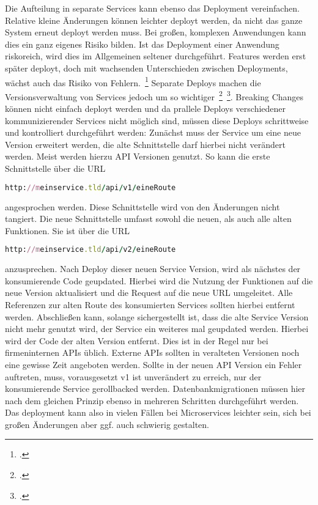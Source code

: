 Die Aufteilung in separate Services kann ebenso das Deployment vereinfachen. Relative kleine Änderungen können leichter deployt werden, da nicht das ganze System erneut deployt werden muss. Bei großen, komplexen Anwendungen kann dies ein ganz eigenes Risiko bilden. Ist das Deployment einer Anwendung riskoreich, wird dies im Allgemeinen seltener durchgeführt. Features werden erst später deployt, doch mit wachsenden Unterschieden zwischen Deployments, wächst auch das Risiko von Fehlern.~\footcite[vgl.][Seite 6]{newman2015building} Separate Deploys machen die Versionsverwaltung von Services jedoch um so wichtiger~\footcite[vgl.][Seite 62]{newman2015building}~\footcite[vgl.][]{Vergleichsartikel}. Breaking Changes können nicht einfach deployt werden und da prallele Deploys verschiedener kommunizierender Services nicht möglich sind, müssen diese Deploys schrittweise und kontrolliert durchgeführt werden: Zunächst muss der Service um eine neue Version erweitert werden, die alte Schnittstelle darf hierbei nicht verändert werden. Meist werden hierzu API Versionen genutzt. So kann die erste Schnittstelle über die URL

\begin{lstlisting}[language=Ruby]
http://meinservice.tld/api/v1/eineRoute
\end{lstlisting}

angesprochen werden. Diese Schnittstelle wird von den Änderungen nicht tangiert. Die neue Schnittstelle umfasst sowohl die neuen, als auch alle alten Funktionen. Sie ist über die URL

\begin{lstlisting}[language=Ruby]
http://meinservice.tld/api/v2/eineRoute
\end{lstlisting}

anzusprechen. Nach Deploy dieser neuen Service Version, wird als nächstes der konsumierende Code geupdated. Hierbei wird die Nutzung der Funktionen auf die neue Version aktualisiert und die Request auf die neue URL umgeleitet. Alle Referenzen zur alten Route des konsumierten Services sollten hierbei entfernt werden. Abschließen kann, solange sichergestellt ist, dass die alte Service Version nicht mehr genutzt wird, der Service ein weiteres mal geupdated werden. Hierbei wird der Code der alten Version entfernt. Dies ist in der Regel nur bei firmeninternen APIs üblich. Externe APIs sollten in veralteten Versionen noch eine gewisse Zeit angeboten werden. Sollte in der neuen API Version ein Fehler auftreten, muss, vorausgesetzt v1 ist unverändert zu erreich, nur der konsumierende Service gerollbacked werden. Datenbankmigrationen müssen hier nach dem gleichen Prinzip ebenso in mehreren Schritten durchgeführt werden. Das deployment kann also in vielen Fällen bei Microservices leichter sein, sich bei großen Änderungen aber ggf. auch schwierig gestalten.

